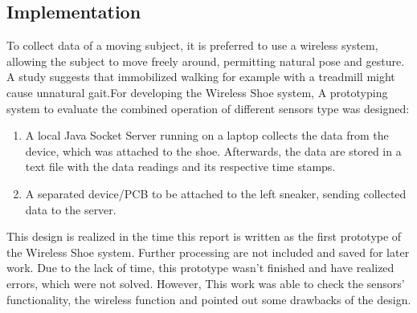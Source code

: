 \documentclass[12pt,a4paper]{article}
\begin{document}
\subsection{Implementation}
\hspace{10mm} To collect data of a moving subject, it is preferred to use a wireless system, allowing the subject to move freely around, permitting natural pose and gesture. A study suggests that immobilized walking for example with a treadmill might cause unnatural gait\cite{And03astudy}.For developing the Wireless Shoe system, A prototyping system to evaluate the combined operation of different sensors type was designed:
\begin{enumerate}
\item A local Java Socket Server running on a laptop collects the data from the device, which was attached to the shoe. Afterwards, the data are stored in a text file with the data readings and its respective time stamps.
\item A separated device/PCB to be attached to the left sneaker, sending collected data to the server. 
\end{enumerate}
This design is realized in the time this report is written as the first prototype of the Wireless Shoe system. Further processing are not included and saved for later work. Due to the lack of time, this prototype wasn't finished and have realized errors, which were not solved. However, This work was able to check the sensors' functionality, the wireless function and pointed out some drawbacks of the design.  
\end{document}
